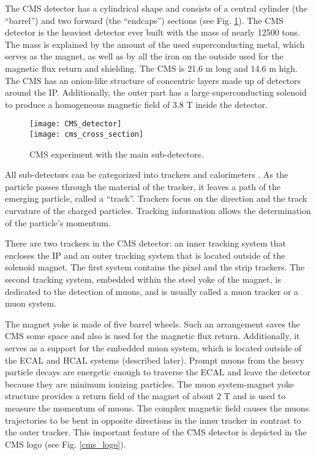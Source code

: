 \begin{normalsize}
The CMS detector has a cylindrical shape and consists of a central cylinder (the ``barrel'') and two forward (the ``endcaps'') sections (see Fig. \ref{CMS_detector}). 
The CMS detector is the heaviest detector ever built with the mass of nearly 12500 tons. The mass is explained by the amount of the used superconducting metal, which serves as the magnet, as well as by all the iron on the outside used for the magnetic flux return and shielding. The CMS is 21.6 m long and 14.6 m high. The CMS has an onion-like structure of concentric layers made up of detectors around the IP. Additionally, the outer part has a large superconducting solenoid to produce a homogeneous magnetic field of 3.8 T inside the detector.

\begin{figure}[H]
  \centering
  \texttt{[image: CMS\_detector]}\\
  \vspace{1cm}
  \texttt{[image: cms\_cross\_section]}
  \caption{CMS experiment with the main sub-detectors.}
  \label{CMS_detector}
\end{figure}

All sub-detectors can be categorized into trackers and calorimeters \cite{Hauptman:2011zza}. As the particle passes through the material of the tracker, it leaves a path of the emerging particle, called a ``track''. Trackers focus on the direction and the track curvature of the charged particles. Tracking information allows the determination of the particle's momentum. 

There are two trackers in the CMS detector: an inner tracking system that encloses the IP and an outer tracking system that is located outside of the solenoid magnet. The first system contains the pixel and the strip trackers. The second tracking system, embedded within the steel yoke of the magnet, is dedicated to the detection of muons, and is usually called a muon tracker or a muon system. 

The magnet yoke is made of five barrel wheels. Such an arrangement saves the CMS some space and also is used for the magnetic flux return. Additionally, it serves as a support for the embedded muon system, which is located outside of the ECAL and HCAL systems (described later). Prompt muons from the heavy particle decays are energetic enough to traverse the ECAL and leave the detector because they are minimum ionizing particles. The muon system-magnet yoke structure provides a return field of the magnet of about 2 T and is used to measure the momentum of muons. The complex magnetic field causes the muons trajectories to be bent in opposite directions in the inner tracker in contrast to the outer tracker. This important feature of the CMS detector is depicted in the CMS logo (see Fig. \ref{cms_logo}). 


\end{normalsize}

